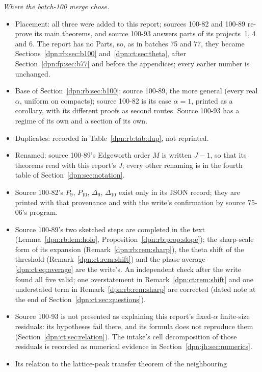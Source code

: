 \documentclass[11pt]{article}
\numberwithin{equation}{section}
\theoremstyle{definition}\newtheorem{definition}[theorem]{Definition}
\theoremstyle{remark}\newtheorem{remark}[theorem]{Remark}
\begin{document}
\emph{Where the batch-100 merge chose.}
\begin{itemize}
\item Placement: all three were added to this report; sources 100-82 and
      100-89 re-prove its main theorems, and source 100-93 answers parts of
      its projects~1, 4 and 6.  The report has no Parts, so, as in batches 75
      and 77, they became Sections~\ref{dpn:rb:sec:b100}
      and~\ref{dpn:ct:sec:theta}, after Section~\ref{dpn:fp:sec:b77} and before
      the appendices; every earlier number is unchanged.
\item Base of Section~\ref{dpn:rb:sec:b100}: source 100-89, the more general
      (every real $\alpha$, uniform on compacts); source 100-82 is its case
      $\alpha=1$, printed as a corollary, with its different proofs as second
      routes.  Source 100-93 has a regime of its own and a section of its own.
\item Duplicates: recorded in Table~\ref{dpn:rb:tab:dup}, not reprinted.
\item Renamed: source 100-89's Edgeworth order $M$ is written $J-1$, so that
      its theorems read with this report's $J$; every other renaming is in the
      fourth table of Section~\ref{dpn:sec:notation}.
\item Source 100-82's $P_9$, $P_{10}$, $\Delta_9$, $\Delta_{10}$ exist only in its
      JSON record; they are printed with that provenance and with the write's
      confirmation by source 75-06's program.
\item Source 100-89's two sketched steps are completed in the text
      (Lemma~\ref{dpn:rb:lem:holo}, Proposition~\ref{dpn:rb:prop:slope}); the
      sharp-scale form of its expansion (Remark~\ref{dpn:rb:rem:sharp}), the
      theta shift of the threshold (Remark~\ref{dpn:ct:rem:shift}) and the
      phase average \eqref{dpn:ct:eq:average} are the write's.  An independent
      check after the write found all five valid; one overstatement in
      Remark~\ref{dpn:ct:rem:shift} and one understated term in
      Remark~\ref{dpn:rb:rem:sharp} are corrected (dated note at the end of
      Section~\ref{dpn:ct:sec:questions}).
\item Source 100-93 is not presented as explaining this report's fixed-$\alpha$
      finite-size residuals: its hypotheses fail there, and its formula does
      not reproduce them (Section~\ref{dpn:ct:sec:relation}).  The intake's
      cell decomposition of those residuals is recorded as numerical evidence
      in Section~\ref{dpn:jh:sec:numerics}.
\item Its relation to the lattice-peak transfer theorem of the neighbouring

\end{itemize}
\end{document}
